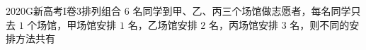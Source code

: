 
\begin{problem}{2020}{G}{新高考I卷}{3}{排列组合}
$ 6 $ 名同学到甲、乙、丙三个场馆做志愿者，每名同学只去 $ 1 $ 个场馆，甲场馆安排 $ 1 $ 名，乙场馆安排 $ 2 $ 名，丙场馆安排 $ 3 $ 名，则不同的安排方法共有
\begin{choices}
\end{choices}
\end{problem}

\begin{answer}

\end{answer}

\begin{solutions}

\end{solutions}